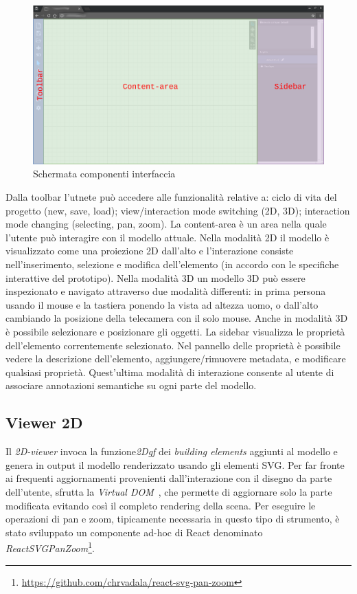 \begin{figure}[htbp] %
   \centering
   \includegraphics[width=1\linewidth]{images/mock-interfaccia}
   \caption{Schermata componenti interfaccia}
   \label{fig:interfaccia}
\end{figure}
\newpage
Dalla toolbar l'utnete pu\`o accedere alle funzionalit\`a relative a: ciclo di vita del progetto (new, save, load);
view/interaction mode switching (2D, 3D); interaction mode changing (selecting, pan, zoom).
La content-area \`e un area nella quale l'utente pu\`o interagire con il modello attuale. Nella modalit\`a 2D
il modello \`e visualizzato come una proiezione 2D dall'alto e l'interazione consiste nell'inserimento, selezione e modifica
dell'elemento (in accordo con le specifiche interattive del prototipo). Nella modalità 3D un modello 3D pu\`o essere
inspezionato e navigato attraverso due modalità differenti: in prima persona usando il mouse e la tastiera ponendo la vista
ad altezza uomo, o dall'alto cambiando la posizione della telecamera con il solo mouse. Anche in modalità 3D è possibile
selezionare e posizionare gli oggetti.
La sidebar visualizza le propriet\`a dell'elemento correntemente selezionato. Nel pannello delle propriet\`a \`e possibile
vedere la descrizione dell'elemento, aggiungere/rimuovere metadata, e modificare qualsiasi propriet\`a.
Quest'ultima modalità di interazione consente al utente di associare annotazioni semantiche su ogni parte del modello.
\newpage

\subsection{Viewer 2D}
Il \emph{2D-viewer} invoca la funzione\emph{2Dgf} dei \emph{building elements} aggiunti al modello e genera in output il modello
renderizzato usando gli elementi SVG.
Per far fronte ai frequenti aggiornamenti provenienti dall'interazione con il disegno da parte dell'utente,
sfrutta la \emph{Virtual DOM}~\cite{vdom}, che permette di aggiornare solo la parte modificata evitando così
il completo rendering della scena. Per eseguire le operazioni di pan e zoom, tipicamente necessaria in questo
tipo di strumento, è stato sviluppato un componente ad-hoc
di React denominato \emph{ReactSVGPanZoom}\footnote{\url{https://github.com/chrvadala/react-svg-pan-zoom}}.\\

